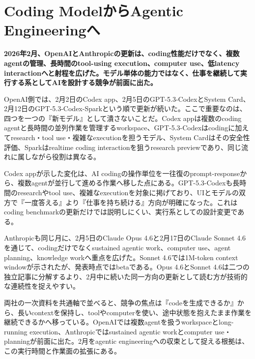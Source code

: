 \section{Coding ModelからAgentic Engineeringへ}
\noindent\textbf{2026年2月、OpenAIとAnthropicの更新は、coding性能だけでなく、複数agentの管理、長時間のtool-using execution、computer use、低latency interactionへと射程を広げた。モデル単体の能力ではなく、仕事を継続して実行する系としてAIを設計する競争が前面に出た。}\autocite{src-15823ae5556e,src-9aba7995b6a5,src-f6aa679babd7}

OpenAI側では、2月2日のCodex app、2月5日のGPT-5.3-CodexとSystem Card、2月12日のGPT-5.3-Codex-Sparkという順で更新が続いた。ここで重要なのは、四つを一つの『新モデル』として潰さないことだ。Codex appは複数のcoding agentと長時間の並列作業を管理するworkspace、GPT-5.3-Codexはcodingに加えてresearch・tool use・複雑なexecutionを担うモデル、System Cardはその安全性評価、Sparkはrealtime coding interactionを狙うresearch previewであり、同じ流れに属しながら役割は異なる。\autocite{src-15823ae5556e,src-4a841ea7ec7c,src-9aba7995b6a5,src-dd64fe3084a4}


Codex appが示した変化は、AI codingの操作単位を一往復のprompt-responseから、複数agentが並行して進める作業へ移した点にある。GPT-5.3-Codexも長時間のresearchやtool use、複雑なexecutionを対象に掲げており、UIとモデルの双方で『一度答える』より『仕事を持ち続ける』方向が明確になった。これはcoding benchmarkの更新だけでは説明しにくい、実行系としての設計変更である。\autocite{src-15823ae5556e,src-9aba7995b6a5}


Anthropicも同じ月に、2月5日のClaude Opus 4.6と2月17日のClaude Sonnet 4.6を通じて、codingだけでなくsustained agentic work、computer use、agent planning、knowledge workへ重点を広げた。Sonnet 4.6では1M-token context windowが示されたが、発表時点ではbetaである。Opus 4.6とSonnet 4.6は二つの独立記事に分解するより、2月中に続いた同一方向の更新として読む方が技術的な連続性を捉えやすい。\autocite{src-f6aa679babd7}


両社の一次資料を共通軸で並べると、競争の焦点は『codeを生成できるか』から、長いcontextを保持し、toolやcomputerを使い、途中状態を抱えたまま作業を継続できるかへ移っている。OpenAIでは複数agentを扱うworkspaceとlong-running execution、Anthropicではsustained agentic workとcomputer use・planningが前面に出た。2月をagentic engineeringへの収束として捉える根拠は、この実行時間と作業面の拡張にある。\autocite{src-15823ae5556e,src-9aba7995b6a5,src-f6aa679babd7}


